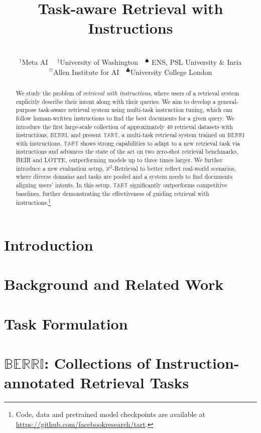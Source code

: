 \documentclass[11pt]{article}
\title{Task-aware Retrieval with Instructions}
\author{\parbox{0.9\linewidth}{\centering{
Akari Asai$^{\dagger\ddagger}$, Timo Schick$^{\dagger}$, Patrick Lewis$^{\dagger}$, Xilun Chen$^{\dagger}$, Gautier Izacard$^{\dagger\spadesuit}$, Sebastian Riedel$^{\clubsuit}$, Hannaneh Hajishirzi$^{\ddagger\heartsuit}$, Wen-tau Yih$^{\dagger}$} \\
{\rm $^\dagger$Meta AI ~~$^\ddagger$University of Washington~~$^\spadesuit$ ENS, PSL University \& Inria \\$^\heartsuit$Allen Institute for AI~~$^\clubsuit$University College London} \\
}
}
\newcommand{\rib}{$\mathbb{BERRI}$\xspace}
\newcommand{\model}{$\mathbb{TART}$\xspace}
\newcommand{\task}{$\mathbb{X}^2$-Retrieval\xspace}
\begin{document}
\maketitle
\begin{abstract}

We study the problem of \emph{retrieval with instructions}, where users of a retrieval system explicitly describe their intent along with their queries.
We aim to develop a general-purpose task-aware retrieval system using multi-task instruction tuning, which can follow human-written instructions to find the best documents for a given query.
{We introduce the first large-scale collection of approximately 40 retrieval datasets with instructions, \rib, and present \model, a multi-task retrieval system trained on \rib with instructions. }
{\model shows strong capabilities to adapt to a new retrieval task via instructions and advances the state of the art on two zero-shot retrieval benchmarks, BEIR and LOTTE, outperforming models up to three times larger.}
We further introduce a new evaluation setup, \task to better reflect real-world scenarios, {where diverse domains and tasks are pooled and a system needs to find documents aligning users' intents}. In this setup, \model significantly outperforms competitive baselines, further demonstrating the effectiveness of guiding retrieval with instructions.\footnote{Code, data and pretrained model checkpoints are available at \url{https://github.com/facebookresearch/tart}. }


\end{abstract}


\section{Introduction}

\section{Background and Related Work}

\section{Task Formulation}

\section{\rib: Collections of Instruction-annotated Retrieval Tasks}

\end{document}
